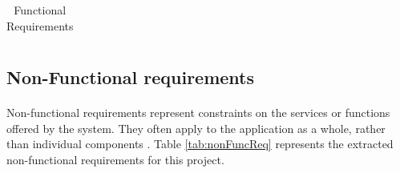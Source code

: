 \documentclass{l4proj}
\begin{document}
\begin{table}[ht]
\begin{adjustbox}{width=1\textwidth}
\begin{tabular}{|c|@{}c@{}|}
		\end{tabular}
	\end{adjustbox}
	\caption{Functional Requirements}
	\label{tab:funcReq}
\end{table}


\subsection{Non-Functional requirements}
\paragraph{}
Non-functional requirements represent constraints on the services or functions offered by the system. They often apply to the application as a whole, rather than individual components \cite{sene}. Table \ref{tab:nonFuncReq} represents the extracted non-functional requirements for this project. 

\end{document}
